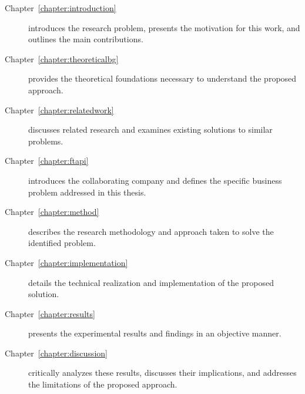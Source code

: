 \begin{description}
\item[Chapter~\ref{chapter:introduction}] introduces the research problem, presents the motivation for this work, and outlines the main contributions.

\item[Chapter~\ref{chapter:theoreticalbg}] provides the theoretical foundations necessary to understand the proposed approach.

\item[Chapter~\ref{chapter:relatedwork}] discusses related research and examines existing solutions to similar problems.

\item[Chapter~\ref{chapter:ftapi}] introduces the collaborating company and defines the specific business problem addressed in this thesis.

\item[Chapter~\ref{chapter:method}] describes the research methodology and approach taken to solve the identified problem.

\item[Chapter~\ref{chapter:implementation}] details the technical realization and implementation of the proposed solution.

\item[Chapter~\ref{chapter:results}] presents the experimental results and findings in an objective manner.

\item[Chapter~\ref{chapter:discussion}] critically analyzes these results, discusses their implications, and addresses the limitations of the proposed approach.
\end{description}